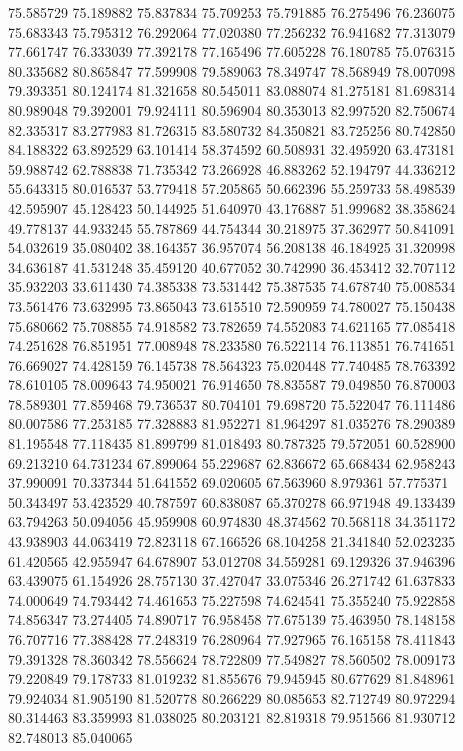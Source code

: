 75.585729
75.189882
75.837834
75.709253
75.791885
76.275496
76.236075
75.683343
75.795312
76.292064
77.020380
77.256232
76.941682
77.313079
77.661747
76.333039
77.392178
77.165496
77.605228
76.180785
75.076315
80.335682
80.865847
77.599908
79.589063
78.349747
78.568949
78.007098
79.393351
80.124174
81.321658
80.545011
83.088074
81.275181
81.698314
80.989048
79.392001
79.924111
80.596904
80.353013
82.997520
82.750674
82.335317
83.277983
81.726315
83.580732
84.350821
83.725256
80.742850
84.188322
63.892529
63.101414
58.374592
60.508931
32.495920
63.473181
59.988742
62.788838
71.735342
73.266928
46.883262
52.194797
44.336212
55.643315
80.016537
53.779418
57.205865
50.662396
55.259733
58.498539
42.595907
45.128423
50.144925
51.640970
43.176887
51.999682
38.358624
49.778137
44.933245
55.787869
44.754344
30.218975
37.362977
50.841091
54.032619
35.080402
38.164357
36.957074
56.208138
46.184925
31.320998
34.636187
41.531248
35.459120
40.677052
30.742990
36.453412
32.707112
35.932203
33.611430
74.385338
73.531442
75.387535
74.678740
75.008534
73.561476
73.632995
73.865043
73.615510
72.590959
74.780027
75.150438
75.680662
75.708855
74.918582
73.782659
74.552083
74.621165
77.085418
74.251628
76.851951
77.008948
78.233580
76.522114
76.113851
76.741651
76.669027
74.428159
76.145738
78.564323
75.020448
77.740485
78.763392
78.610105
78.009643
74.950021
76.914650
78.835587
79.049850
76.870003
78.589301
77.859468
79.736537
80.704101
79.698720
75.522047
76.111486
80.007586
77.253185
77.328883
81.952271
81.964297
81.035276
78.290389
81.195548
77.118435
81.899799
81.018493
80.787325
79.572051
60.528900
69.213210
64.731234
67.899064
55.229687
62.836672
65.668434
62.958243
37.990091
70.337344
51.641552
69.020605
67.563960
8.979361
57.775371
50.343497
53.423529
40.787597
60.838087
65.370278
66.971948
49.133439
63.794263
50.094056
45.959908
60.974830
48.374562
70.568118
34.351172
43.938903
44.063419
72.823118
67.166526
68.104258
21.341840
52.023235
61.420565
42.955947
64.678907
53.012708
34.559281
69.129326
37.946396
63.439075
61.154926
28.757130
37.427047
33.075346
26.271742
61.637833
74.000649
74.793442
74.461653
75.227598
74.624541
75.355240
75.922858
74.856347
73.274405
74.890717
76.958458
77.675139
75.463950
78.148158
76.707716
77.388428
77.248319
76.280964
77.927965
76.165158
78.411843
79.391328
78.360342
78.556624
78.722809
77.549827
78.560502
78.009173
79.220849
79.178733
81.019232
81.855676
79.945945
80.677629
81.848961
79.924034
81.905190
81.520778
80.266229
80.085653
82.712749
80.972294
80.314463
83.359993
81.038025
80.203121
82.819318
79.951566
81.930712
82.748013
85.040065
